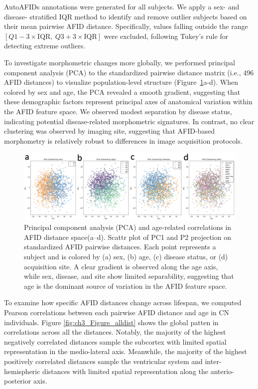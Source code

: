 AutoAFIDs annotations were generated for all subjects. We apply a sex- and disease- stratified IQR method to identify and remove outlier subjects based on their mean pairwise AFID distance. Specifically, values falling outside the range \( [Q1 - 3 \times \text{IQR},\ Q3 + 3 \times \text{IQR}] \) were excluded, following Tukey’s rule for detecting extreme outliers.

To investigate morphometric changes more globally, we performed principal component analysis (PCA) to the standardized pairwise distance matrix (i.e., 496 AFID distances) to visualize population-level structure (Figure~\ref{fig:ch3_Figure_PCA}a-d). When colored by sex and age, the PCA revealed a smooth gradient, suggesting that these demographic factors represent principal axes of anatomical variation within the AFID feature space. We observed modest separation by disease status, indicating potential disease-related morphometric signatures. In contrast, no clear clustering was observed by imaging site, suggesting that AFID-based morphometry is relatively robust to differences in image acquisition protocols.
\begin{figure}[hbt!]
    \centering
    \includegraphics[width=1\linewidth]{figs/ch3_Figure_PCA.png}
    \caption{Principal component analysis (PCA) and age-related correlations in AFID distance space(a–d). Scattr plot of PC1 and P2 projection on standardized AFID pairwise distances. Each point represents a subject and is colored by (a) sex, (b) age, (c) disease status, or (d) acquisition site. A clear gradient is observed along the age axis, while sex, disease, and site show limited separability, suggesting that age is the dominant source of variation in the AFID feature space.}
    \label{fig:ch3_Figure_PCA}
\end{figure}


To examine how specific AFID distances change across lifespan, we computed Pearson correlations between each pairwise AFID distance and age in CN individuals. Figure \ref{fig:ch3_Figure_alldist} shows the global patten in correlations across all the distances. Notably, the majority of the highest negatively correlated distances sample the subcortex with limited spatial representation in the medio-lateral axis. Meanwhile, the majority of the highest positively correlated distances sample the ventricular system and inter-hemispheric distances with limited spatial representation along the anterio-posterior axis. 

